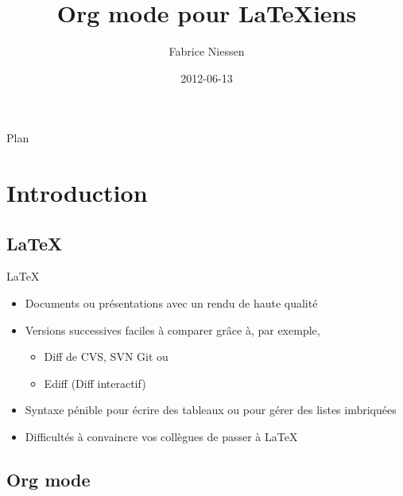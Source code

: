 \documentclass[presentation,t,hideothersubsections]{beamer}
\author{Fabrice Niessen}
\date{2012-06-13}
\title{Org mode pour LaTeXiens}
\begin{document}
\maketitle
\begin{frame}{Plan}
\tableofcontents
\end{frame}



\section{Introduction}
\label{sec-1}

\subsection{\LaTeX{}}
\label{sec-1-1}

\begin{frame}[label=sec-1-1-1]{\LaTeX{}}
\begin{itemize}
\item Documents ou présentations avec un rendu de haute qualité

\item Versions successives faciles à comparer grâce à, par exemple,
\begin{itemize}
\item Diff de CVS, SVN Git ou
\item Ediff (Diff interactif)
\end{itemize}

\item Syntaxe pénible pour écrire des tableaux ou pour gérer des listes
imbriquées

\item Difficultés à convaincre vos collègues de passer à \LaTeX{}
\end{itemize}
\end{frame}
\subsection{Org mode}
\label{sec-1-2}
\end{document}
